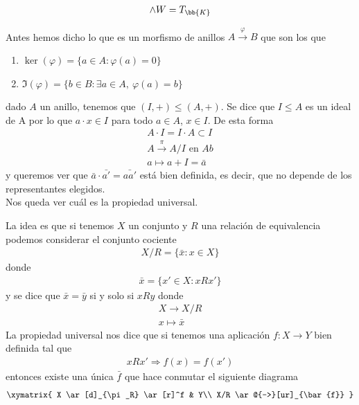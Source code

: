 \begin{gather*}
    \wedge W = T_{\bb{K}} 
\end{gather*}

Antes hemos dicho lo que es un morfismo de anillos $A \overset{\varphi}{\to} B$ que son los que 
\begin{enumerate}
    \item $\ker(\varphi) = \{a \in A : \varphi(a) = 0\}$
    \item $\Im(\varphi) = \{b\in B : \exists a \in A,\ \varphi(a) = b\}$
\end{enumerate}
dado $A$ un anillo, tenemos que $(I,+) \leq (A,+)$. Se dice que $I\leq A$ es un ideal de A por lo que $a\cdot x \in I$ para todo $a\in A$, $x\in I$. De esta forma
\begin{gather*}
    A \cdot I = I \cdot A \subset I\\
    A \overset{\pi}{\to} A/I \text{ en } Ab\\
    a \mapsto a + I = \bar{a}
\end{gather*}
y queremos ver que $\bar{a} \cdot \bar{a'} = \bar{aa'}$ está bien definida, es decir, que no depende de los representantes elegidos. \\

Nos queda ver cuál es la propiedad universal. 

La idea es que si tenemos $X$ un conjunto y $R$ una relación de equivalencia podemos considerar el conjunto cociente
\begin{gather*}
    X/R = \{\bar{x} : x\in X\}
\end{gather*}
donde
\begin{gather*}
    \bar{x} = \{x'\in X : xRx'\}
\end{gather*}
y se dice que $\bar{x} = \bar{y}$ si y solo si $xRy$ donde
\begin{gather*}
    X \to X/R \\
    x \mapsto \bar{x}
\end{gather*}
La propiedad universal nos dice que si tenemos una aplicación $f:X\to Y$ bien definida tal que 
\begin{gather*}
    xRx' \Rightarrow f(x)=f(x')
\end{gather*}
entonces existe una única $\bar{f}$ que hace conmutar el siguiente diagrama
\begin{gather*}
    \xymatrix{
        X \ar[d]_{\pi_R} \ar[r]^f & Y\\
        X/R \ar@{-->}[ur]_{\bar{f}}
    }
\end{gather*}

